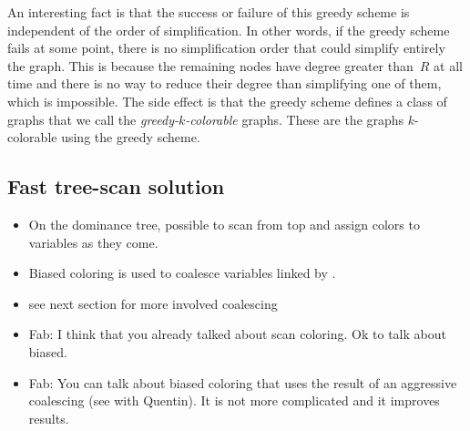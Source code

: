 {An interesting fact is that the success or failure of this greedy scheme is 
independent of the order of simplification. In other words, if the greedy 
scheme fails at some point, there is no simplification order that could 
simplify entirely the graph. This is because the remaining nodes have degree 
greater than~$R$ at all time and there is no way to reduce their degree than 
simplifying one of them, which is impossible. The side effect is that the 
greedy scheme defines a class of graphs that we call the 
\emph{greedy-$k$-colorable} graphs. These are the graphs $k$-colorable using 
the greedy scheme.


\begin{comment}
\begin{function}[h]
\captionlabel{\labelkgreedy}{Is\_kGreedy}{($G$)}
\KwData{Undirected graph $G=(V,E)$; $\forall v\in V$, degree[$v$] = \#neighbors 
of $v$ in $G$, $k$ number of colors}
stack = $\emptyset$ ;
$\mbox{worklist} = \{ v \in V \mid \mbox{degree[$v$]} < k\}$ \;
\While{$\mbox{worklist} \neq \emptyset$}{
  \KwLet $v \in \mbox{worklist}$ \;
  \ForEach{$w$ neighbor of $v$}{
     degree[$w$] \<- degree[w]-1 \;
     \lIf{$\mbox{degree[$w$]} = k-1$}{worklist \<- $\mbox{worklist} \cup \{w\}$}
  }
  push $v$ on stack ;
  worklist \<- $\mbox{worklist} \setminus \{v\}$  \tcc*{Remove $v$ from  $G$}
}
\lIf{$V = \emptyset$}{\Return{\KwTrue}}
\lElse{\Return{\KwFalse}}
\end{function} 
\end{comment} 







\subsection{Fast tree-scan solution}
\begin{itemize}
  \item On the dominance tree, possible to scan from top and assign colors to 
    variables as they come.
  \item Biased coloring is used to coalesce variables linked by \phifuns.
  \item see next section for more involved coalescing
  \item Fab: I think that you already talked about scan coloring. Ok to talk about biased.
  \item Fab: You can talk about biased coloring that uses the result of an aggressive coalescing (see with Quentin). It is not more complicated and it improves results.
\end{itemize}



}
